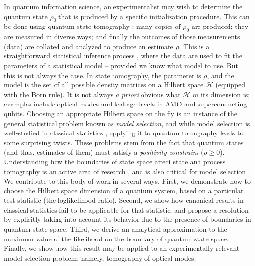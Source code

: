 \documentclass[aps,pra, twocolumn]{revtex4-1}
\newcommand{\cH}{\mathcal{H}}
\newcommand{\rhohat}{\hat{\rho}}
\begin{document}
In quantum information science, an experimentalist may wish to determine the quantum state $\rho_{0}$ that is produced by a specific initialization procedure.  This can be done using quantum state tomography \cite{Paris2004}:  many copies of $\rho_{0}$ are produced; they are measured in diverse ways; and finally the outcomes of those measurements (data) are collated and analyzed to produce an estimate $\rhohat$.  This is a straightforward statistical inference process \cite{Reid2015, Wasserman2004}, where the data are used to fit the parameters of a statistical model -- provided  we know what  model to use.  But this is not always the case.  In state tomography, the parameter is $\rho$, and the model is the set of all possible density matrices on a Hilbert space $\cH$ (equipped with the Born rule). It is not always \emph{a priori} obvious what $\cH$ or its dimension is; examples include optical modes \cite{Altepeter2005, Bertrand1987, Lvovsky2009, Breitenbach1997, Leonhardt1995} and leakage levels in AMO and superconducting \cite{Motzoi2009, Fazio1999} qubits. 
Choosing an appropriate Hilbert space on the fly is an instance of the general statistical problem known as \emph{model selection}, and while model selection is well-studied in classical statistics \cite{Burnham2004}, applying it to quantum tomography leads to some surprising twists.  These problems stem from the fact that quantum states (and thus, estimates of them) must satisfy a \emph{positivity constraint} ($\rho\geq0$). Understanding how the boundaries of state space affect state and process tomography  is an active area of research \cite{Candes2006, Flammia2012a, Suess2016, Carpentier2015}, and is also critical for model selection \cite{Schwarz2013a, Guta2012a, VanEnk2013a, Langford2013, Yin2011, Moroder2013, Knips2015}. We contribute to this body of work in several ways. First, we demonstrate how to choose the Hilbert space dimension of a quantum system, based on a particular test statistic (the loglikelihood ratio). Second, we show how canonical results in classical statistics fail to be applicable for that statistic, and propose a resolution by explicitly taking into account its behavior due to the presence of boundaries in quantum state space. Third, we derive an analytical approximation to the maximum value of the likelihood  on the boundary of quantum state space. Finally, we show how this result may be applied to an experimentally relevant model selection problem; namely, tomography of optical modes.
\end{document}
